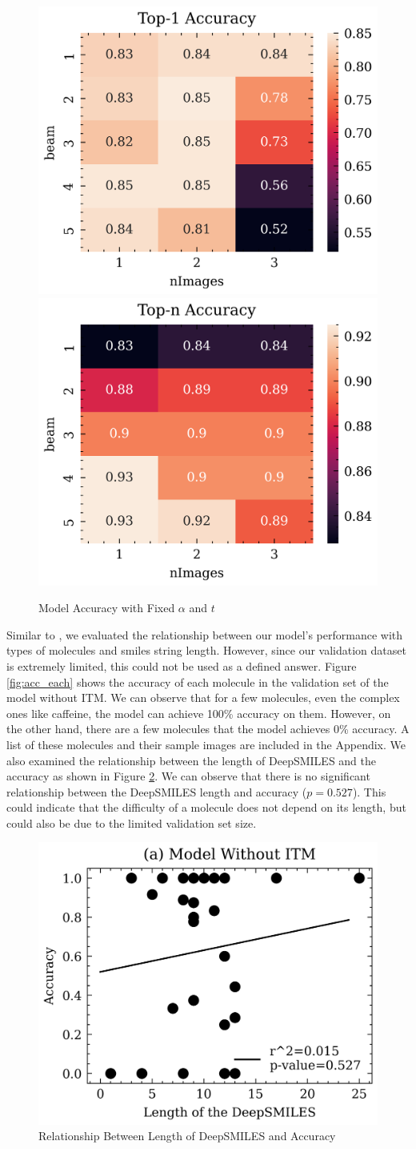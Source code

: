 \documentclass[12pt]{article}
\begin{document}
\begin{figure}
    \centering
    \includegraphics[width=0.45\linewidth]{top1.png}
    \includegraphics[width=0.45\linewidth]{topn.png}
    \caption{Model Accuracy with Fixed $\alpha$ and $t$}
    \label{fig:grid}
\end{figure}

Similar to \cite{swinocsr}, we evaluated the relationship between our model's performance with types of molecules and smiles string length. However, since our validation dataset is extremely limited, this could not be used as a defined answer. Figure \ref{fig:acc_each} shows the accuracy of each molecule in the validation set of the model without ITM. We can observe that for a few molecules, even the complex ones like caffeine, the model can achieve 100\% accuracy on them. However, on the other hand, there are a few molecules that the model achieves 0\% accuracy. A list of these molecules and their sample images are included in the Appendix. We also examined the relationship between the length of DeepSMILES and the accuracy as shown in Figure \ref{lenacc}. We can observe that there is no significant relationship between the DeepSMILES length and accuracy ($p=0.527$). This could indicate that the difficulty of a molecule does not depend on its length, but could also be due to the limited validation set size.  

\begin{figure}
    \centering
    \includegraphics[width=0.5\linewidth]{lenacc.png}
    \caption{Relationship Between Length of DeepSMILES and Accuracy}
    \label{lenacc}
\end{figure}
\end{document}
